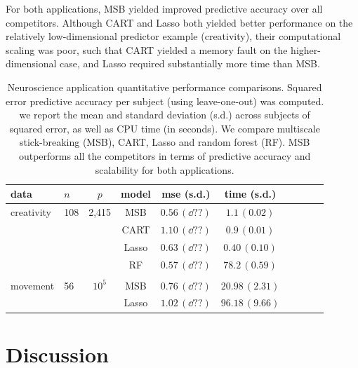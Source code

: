 For both applications, MSB yielded improved predictive accuracy over all competitors.  Although CART and Lasso both yielded better performance on the relatively low-dimensional predictor example (creativity), their computational scaling was poor, such that CART yielded a memory fault on the higher-dimensional case, and Lasso required substantially more time than MSB.  







\begin{table}[t]
\caption{Neuroscience application quantitative performance comparisons. Squared error predictive accuracy per subject (using leave-one-out) was computed. we report the mean and standard deviation (s.d.) across subjects of squared error, as well as CPU time (in seconds).
We compare multiscale stick-breaking (MSB), CART, Lasso and random forest (RF). MSB outperforms all the competitors in terms of predictive accuracy and scalability for both applications.}\label{real}
\vskip 0.15in
\begin{center}
\begin{small}
\begin{sc}
\begin{tabular}{llcccccccc}
\hline
data &$n$&$p$ &model&mse (s.d.) & time (s.d.) \\ %
\hline
creativity & 108 & 2,415 & MSB &$0.56 \, (\dd{??})$ &  $1.1 \, (0.02)$\\
 &&& CART & $1.10 \, (\dd{??}) $ &  $0.9 \, (0.01)$\\
&&& Lasso & $0.63 \, (\dd{??})$  &  $0.40 \, (0.10)$\\
&&& RF & $0.57 \, (\dd{??})$ &   $78.2 \, (0.59)$\\
\\
 movement & 56 & $10^5$& MSB &$0.76 \, (\dd{??})$  & $20.98 \, (2.31)$\\
 &&& Lasso & $1.02 \, (\dd{??})$ & $96.18 \, (9.66)$\\
\hline
\end{tabular}
\end{sc}
\end{small}
\end{center}
\vspace{-10pt}
\end{table}

\section{Discussion} \label{sec:disc}

